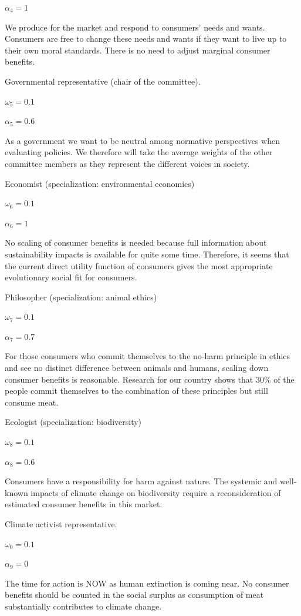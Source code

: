 \documentclass[
]{book}
\begin{document}
\(\alpha_4 = 1\)

We produce for the market and respond to consumers' needs and wants. Consumers are free to change these needs and wants if they want to live up to their own moral standards. There is no need to adjust marginal consumer benefits.

Governmental representative (chair of the committee).

\(\omega_5 = 0.1\)

\(\alpha_5 = 0.6\)

As a government we want to be neutral among normative perspectives when evaluating policies. We therefore will take the average weights of the other committee members as they represent the different voices in society.

Economist (specialization: environmental economics)

\(\omega_6 = 0.1\)

\(\alpha_6 = 1\)

No scaling of consumer benefits is needed because full information about sustainability impacts is available for quite some time. Therefore, it seems that the current direct utility function of consumers gives the most appropriate evolutionary social fit for consumers.

Philosopher (specialization: animal ethics)

\(\omega_7 = 0.1\)

\(\alpha_7 = 0.7\)

For those consumers who commit themselves to the no-harm principle in ethics and see no distinct difference between animals and humans, scaling down consumer benefits is reasonable. Research for our country shows that 30\% of the people commit themselves to the combination of these principles but still consume meat.

Ecologist (specialization: biodiversity)

\(\omega_8 = 0.1\)

\(\alpha_8 = 0.6\)

Consumers have a responsibility for harm against nature. The systemic and well-known impacts of climate change on biodiversity require a reconsideration of estimated consumer benefits in this market.

Climate activist representative.

\(\omega_0 = 0.1\)

\(\alpha_9 = 0\)

The time for action is NOW as human extinction is coming near. No consumer benefits should be counted in the social surplus as consumption of meat substantially contributes to climate change.
\end{document}
